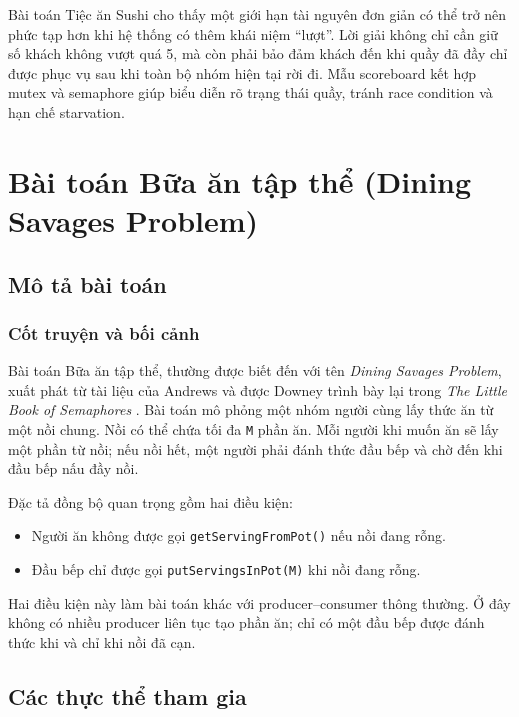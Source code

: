 Bài toán Tiệc ăn Sushi cho thấy một giới hạn tài nguyên đơn giản có thể trở nên
phức tạp hơn khi hệ thống có thêm khái niệm ``lượt''. Lời giải không chỉ cần
giữ số khách không vượt quá 5, mà còn phải bảo đảm khách đến khi quầy đã đầy
chỉ được phục vụ sau khi toàn bộ nhóm hiện tại rời đi. Mẫu scoreboard kết hợp
mutex và semaphore giúp biểu diễn rõ trạng thái quầy, tránh race condition và
hạn chế starvation.

\newpage
\section{Bài toán Bữa ăn tập thể (Dining Savages Problem)}

\subsection{Mô tả bài toán}

\subsubsection*{Cốt truyện và bối cảnh}

Bài toán Bữa ăn tập thể, thường được biết đến với tên
\textit{Dining Savages Problem}, xuất phát từ tài liệu của Andrews và được
Downey trình bày lại trong \textit{The Little Book of Semaphores}
\cite{andrews}\cite[Sec.~5.1]{downey2016}. Bài toán mô phỏng một nhóm người
cùng lấy thức ăn từ một nồi chung. Nồi có thể chứa tối đa \texttt{M} phần ăn.
Mỗi người khi muốn ăn sẽ lấy một phần từ nồi; nếu nồi hết, một người phải đánh
thức đầu bếp và chờ đến khi đầu bếp nấu đầy nồi.

Đặc tả đồng bộ quan trọng gồm hai điều kiện:

\begin{itemize}
    \item Người ăn không được gọi \texttt{getServingFromPot()} nếu nồi đang rỗng.
    \item Đầu bếp chỉ được gọi \texttt{putServingsInPot(M)} khi nồi đang rỗng.
\end{itemize}

Hai điều kiện này làm bài toán khác với producer--consumer thông thường. Ở đây
không có nhiều producer liên tục tạo phần ăn; chỉ có một đầu bếp được đánh thức
khi và chỉ khi nồi đã cạn.

\subsection{Các thực thể tham gia}

